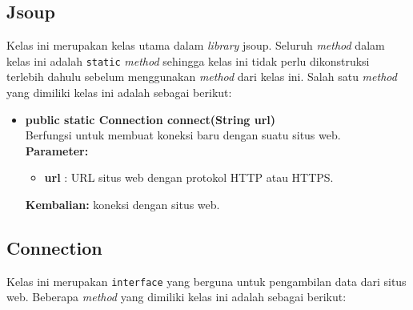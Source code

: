 \subsection{Jsoup}
Kelas ini merupakan kelas utama dalam \textit{library} jsoup. Seluruh \textit{method} dalam kelas ini adalah \texttt{static} \textit{method} sehingga kelas ini tidak perlu dikonstruksi terlebih dahulu sebelum menggunakan \textit{method} dari kelas ini. Salah satu \textit{method} yang dimiliki kelas ini adalah sebagai berikut:
\begin{itemize}
	\item \textbf{public static Connection connect(String url)} \\
		Berfungsi untuk membuat koneksi baru dengan suatu situs web. \\
		\textbf{Parameter:}
		\begin{itemize}
			\item \textbf{url} : URL situs web dengan protokol HTTP atau HTTPS.
		\end{itemize}
		\textbf{Kembalian:} koneksi dengan situs web.
\end{itemize}

\subsection{Connection}
Kelas ini merupakan \texttt{interface} yang berguna untuk pengambilan data dari situs web. Beberapa \textit{method} yang dimiliki kelas ini adalah sebagai berikut:

